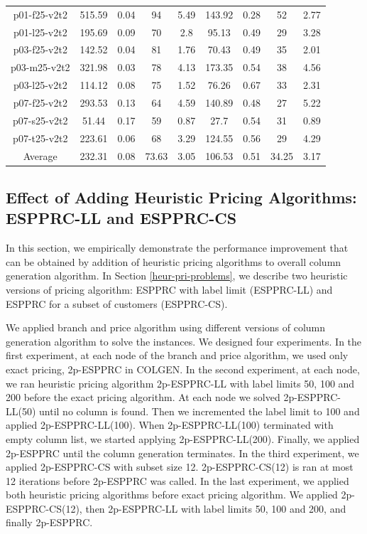 \begin{table}[h]
\begin {tabular}[t]{|c|c|c|c|c|c|c|c|c|}
p01-f25-v2t2    & 515.59 &  0.04    & 94    & 5.49  & 143.92 & 0.28 & 52    & 2.77  \\
p01-l25-v2t2    & 195.69 &  0.09    & 70    & 2.8   & 95.13  & 0.49 & 29    & 3.28  \\
p03-f25-v2t2    & 142.52 &  0.04    & 81    & 1.76  & 70.43  & 0.49 & 35    & 2.01  \\
p03-m25-v2t2    & 321.98 &  0.03    & 78    & 4.13  & 173.35 & 0.54 & 38    & 4.56  \\
p03-l25-v2t2    & 114.12 &  0.08    & 75    & 1.52  & 76.26  & 0.67 & 33    & 2.31  \\
p07-f25-v2t2    & 293.53 &  0.13    & 64    & 4.59  & 140.89 & 0.48 & 27    & 5.22  \\
p07-s25-v2t2    & 51.44  &  0.17    & 59    & 0.87  & 27.7   & 0.54 & 31    & 0.89  \\
p07-t25-v2t2    & 223.61 &  0.06    & 68    & 3.29  & 124.55 & 0.56 & 29    & 4.29  \\\hline
Average         & 232.31 &  0.08    & 73.63 & 3.05  & 106.53 & 0.51 & 34.25 & 3.17  \\\hline
\end{tabular}
\end{table}

\subsection{Effect of Adding Heuristic Pricing Algorithms: ESPPRC-LL and ESPPRC-CS}
In this section, we empirically demonstrate the performance
improvement that can be obtained by addition of heuristic pricing algorithms
to overall column generation algorithm. In Section \ref{heur-pri-problems}, we describe
two heuristic versions of pricing algorithm: ESPPRC with label limit (ESPPRC-LL) and
ESPPRC for a subset of customers (ESPPRC-CS).

We applied branch and price algorithm using different versions of column generation algorithm
to solve the instances. We designed four experiments. In the first experiment, at each node
of the branch and price algorithm,
we used only exact pricing, 2p-ESPPRC in COLGEN. In the second experiment, at each node, we ran
heuristic pricing algorithm 2p-ESPPRC-LL with label limits 50, 100 and 200 before the exact
pricing algorithm. At each node we solved 2p-ESPPRC-LL(50) until no column
is found. Then we incremented the label limit to 100 and applied 2p-ESPPRC-LL(100). When
2p-ESPPRC-LL(100) terminated with empty column list, we started applying  2p-ESPPRC-LL(200).
Finally, we applied 2p-ESPPRC until the column generation terminates.
In the third experiment, we applied 2p-ESPPRC-CS with subset size 12. 2p-ESPPRC-CS(12)
is ran at most 12 iterations before 2p-ESPPRC was called. In the last experiment,
we applied both heuristic pricing algorithms before exact pricing algorithm. We applied
2p-ESPPRC-CS(12), then 2p-ESPPRC-LL with label limits 50, 100 and 200, and finally 2p-ESPPRC.


